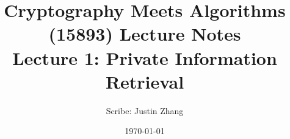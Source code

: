 \documentclass[11pt]{article}
\title{{\Large Cryptography Meets Algorithms (15893) Lecture Notes}\\[5pt]
{\bf Lecture 1: Private Information Retrieval}}
\author{Scribe: Justin Zhang}
\date{\today}
\theoremstyle{definition}{
\newtheorem{definition}[theorem]{Definition}
}
\begin{document}
\maketitle


{

}
%



\end{document}
